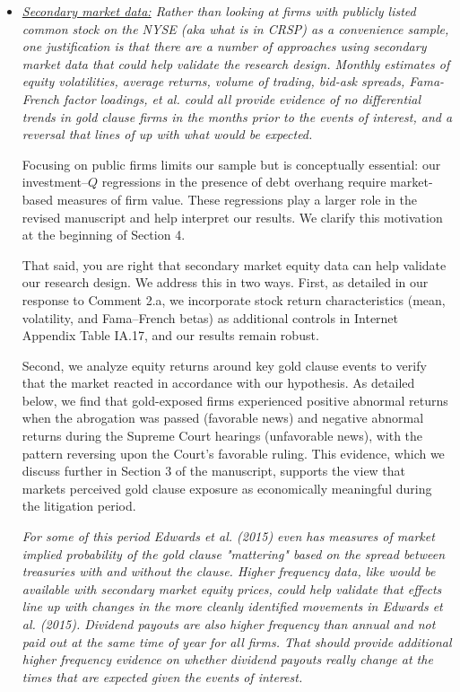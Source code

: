 \begin{itemize}
    \bigskip

    \item[\textit{\textcolor{red!60!black}{c.}}] \textit{\textcolor{red!60!black}{
    \underline{Secondary market data:}
    Rather than looking at firms with publicly listed common stock on the NYSE (aka what is in CRSP) as a convenience sample, one justification is that there are a number of approaches using secondary market data that could help validate the research design. Monthly estimates of equity volatilities, average returns, volume of trading, bid-ask spreads, Fama-French factor loadings, et al. could all provide evidence of no differential trends in gold clause firms in the months prior to the events of interest, and a reversal that lines of up with what would be expected.
    }}

    \bigskip
    
    \noindent Focusing on public firms limits our sample but is conceptually essential: our investment–$Q$ regressions in the presence of debt overhang require market-based measures of firm value. These regressions play a larger role in the revised manuscript and help interpret our results. We clarify this motivation at the beginning of Section 4.

    That said, you are right that secondary market equity data can help validate our research design. We address this in two ways. First, as detailed in our response to Comment 2.a, we incorporate stock return characteristics (mean, volatility, and Fama–French betas) as additional controls in Internet Appendix Table IA.17, and our results remain robust. 
    
    Second, we analyze equity returns around key gold clause events to verify that the market reacted in accordance with our hypothesis. As detailed below, we find that gold-exposed firms experienced positive abnormal returns when the abrogation was passed (favorable news) and negative abnormal returns during the Supreme Court hearings (unfavorable news), with the pattern reversing upon the Court's favorable ruling. This evidence, which we discuss further in Section 3 of the manuscript, supports the view that markets perceived gold clause exposure as economically meaningful during the litigation period.

    \bigskip
    
    \textit{\textcolor{red!60!black}{
    For some of this period Edwards et al. (2015) even has measures of market implied probability of the gold clause "mattering" based on the spread between treasuries with and without the clause. Higher frequency data, like would be available with secondary market equity prices, could help validate that effects line up with changes in the more cleanly identified movements in Edwards et al. (2015). Dividend payouts are also higher frequency than annual and not paid out at the same time of year for all firms. That should provide additional higher frequency evidence on whether dividend payouts really change at the times that are expected given the events of interest.
    }}


\end{itemize}
